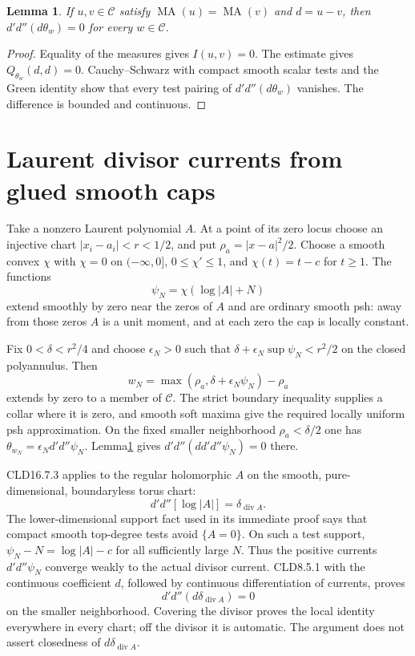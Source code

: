 \documentclass[11pt]{article}
\newtheorem{lemma}[theorem]{Lemma}
\newcommand{\DD}{d'd''}
\newcommand{\MA}{\operatorname{MA}}
\begin{document}
\begin{lemma}\label{annihilate}
If $u,v\in\mathcal C$ satisfy $\MA(u)=\MA(v)$ and $d=u-v$, then
$\DD(d\theta_w)=0$ for every $w\in\mathcal C$.
\end{lemma}
\begin{proof}
Equality of the measures gives $I(u,v)=0$. The estimate gives
$Q_{\theta_w}(d,d)=0$. Cauchy--Schwarz with compact smooth scalar
tests and the Green identity show that every test pairing of
$\DD(d\theta_w)$ vanishes. The difference is bounded and continuous.
\end{proof}

\section{Laurent divisor currents from glued smooth caps}
Take a nonzero Laurent polynomial $A$. At a point of its zero locus
choose an injective chart $|x_i-a_i|<r<1/2$, and put
$\rho_a=|x-a|^2/2$. Choose a smooth convex $\chi$ with
$\chi=0$ on $(-\infty,0]$, $0\le\chi'\le1$, and
$\chi(t)=t-c$ for $t\ge1$. The functions
\[
 \psi_N=\chi(\log|A|+N)
\]
extend smoothly by zero near the zeros of $A$ and are ordinary smooth
psh: away from those zeros $A$ is a unit moment, and at each zero the
cap is locally constant.

Fix $0<\delta<r^2/4$ and choose $\epsilon_N>0$ such that
$\delta+\epsilon_N\sup\psi_N<r^2/2$ on the closed polyannulus.
Then
\[
 w_N=\max(\rho_a,\delta+\epsilon_N\psi_N)-\rho_a
\]
extends by zero to a member of $\mathcal C$. The strict boundary
inequality supplies a collar where it is zero, and smooth soft maxima
give the required locally uniform psh approximation. On the fixed
smaller neighborhood $\rho_a<\delta/2$ one has
$\theta_{w_N}=\epsilon_N\DD\psi_N$. Lemma\ref{annihilate} gives
$\DD(d\DD\psi_N)=0$ there.

CLD16.7.3 applies to the regular holomorphic $A$ on the smooth,
pure-dimensional, boundaryless torus chart:
\[
 \DD[\log|A|]=\delta_{\operatorname{div}A}.
\]
The lower-dimensional support fact used in its immediate proof says
that compact smooth top-degree tests avoid $\{A=0\}$.
On such a test support, $\psi_N-N=\log|A|-c$ for all sufficiently large
$N$. Thus the positive currents $\DD\psi_N$ converge weakly to the
actual divisor current. CLD8.5.1 with the continuous coefficient $d$,
followed by continuous differentiation of currents, proves
\[
 \DD(d\delta_{\operatorname{div}A})=0
\]
on the smaller neighborhood. Covering the divisor proves the local
identity everywhere in every chart; off the divisor it is automatic.
The argument does not assert closedness of $d\delta_{\operatorname{div}A}$.
\end{document}
